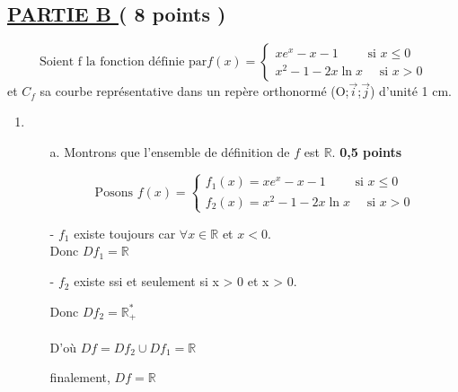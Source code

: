 \documentclass[12pt]{article}
\begin{document}
\subsection*{ \underline{PARTIE B } ( 8 points ) }
\[
\text{Soient f la fonction définie par} 
f(x)=
\begin{cases}
xe^{x}-x-1 \quad\quad  \text{ si }  x \leq 0\\
x^{2}-1-2x\ln x \quad \text{ si } x > 0 
\end{cases}
\]
et $C_{f}$ sa courbe représentative dans un repère orthonormé (O;$\vec{i}$;$\vec{j}$) d'unité 1 cm.
\begin{enumerate}
\item
\begin{enumerate}
\item[a.] Montrons que l'ensemble de définition de $f$ est $\mathbb{R}$.\textbf{ 0,5 points}

\[
\text{Posons } 
f(x)=
\begin{cases}
f_{1}(x)=xe^{x}-x-1 \quad\quad  \text{ si }  x \leq 0\\
f_{2}(x)=x^{2}-1-2x\ln x \quad \text{ si } x > 0 
\end{cases}
\]
\item[-] $f_{1}$ existe toujours car $\forall x\in\mathbb{R}$ et $x<0$. \\

Donc $Df_{1}=\mathbb{R}$

\item[-] $f_{2}$ existe ssi et seulement si x > 0 et x > 0.

Donc $Df_{2}=\mathbb{R}_{+}^{*}$
\\\\
D'où $Df=Df_{2}\cup Df_{1}=\mathbb{R}$

finalement, $Df=\mathbb{R}$

\end{enumerate}
\end{enumerate}
\end{document}
